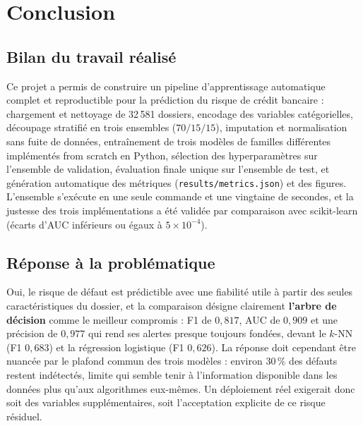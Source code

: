 
\section{Conclusion}
\label{sec:conclusion}

\subsection{Bilan du travail réalisé}

Ce projet a permis de construire un pipeline d'apprentissage automatique
complet et reproductible pour la prédiction du risque de crédit bancaire :
chargement et nettoyage de 32\,581 dossiers, encodage des variables
catégorielles, découpage stratifié en trois ensembles ($70/15/15$), imputation
et normalisation sans fuite de données, entraînement de trois modèles de
familles différentes implémentés from scratch en Python, sélection des
hyperparamètres sur l'ensemble de validation, évaluation finale unique sur
l'ensemble de test, et génération automatique des métriques
(\texttt{results/metrics.json}) et des figures. L'ensemble s'exécute en une
seule commande et une vingtaine de secondes, et la justesse des trois
implémentations a été validée par comparaison avec scikit-learn (écarts d'AUC
inférieurs ou égaux à $5 \times 10^{-4}$).

\subsection{Réponse à la problématique}

Oui, le risque de défaut est prédictible avec une fiabilité utile à partir des
seules caractéristiques du dossier, et la comparaison désigne clairement
\textbf{l'arbre de décision} comme le meilleur compromis : F1 de $0{,}817$,
AUC de $0{,}909$ et une précision de $0{,}977$ qui rend ses alertes presque
toujours fondées, devant le $k$-NN (F1 $0{,}683$) et la régression logistique
(F1 $0{,}626$). La réponse doit cependant être nuancée par le plafond commun
des trois modèles : environ $30\,\%$ des défauts restent indétectés, limite qui
semble tenir à l'information disponible dans les données plus qu'aux
algorithmes eux-mêmes. Un déploiement réel exigerait donc soit des variables
supplémentaires, soit l'acceptation explicite de ce risque résiduel.

